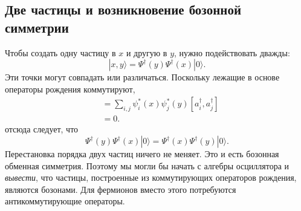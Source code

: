 \begin{classroomqa}
\end{classroomqa}

\subsection{Две частицы и возникновение бозонной симметрии}

Чтобы создать одну частицу в \(x\) и другую в \(y\), нужно подействовать дважды:
\begin{equation}
|x,y\rangle
=\Psi^\dagger(y)\Psi^\dagger(x)|0\rangle.
\label{eq:l06-two-particle-state}
\end{equation}
Эти точки могут совпадать или различаться. Поскольку лежащие в основе операторы рождения коммутируют,
\begin{align}
[\Psi^\dagger(x),\Psi^\dagger(y)]
&=\sum_{i,j}\psi_i^*(x)\psi_j^*(y)
[a_i^\dagger,a_j^\dagger] \\
&=0.
\end{align}
отсюда следует, что
\begin{equation}
\Psi^\dagger(y)\Psi^\dagger(x)|0\rangle
=\Psi^\dagger(x)\Psi^\dagger(y)|0\rangle.
\label{eq:l06-boson-exchange}
\end{equation}
Перестановка порядка двух частиц ничего не меняет. Это и есть бозонная обменная симметрия. Поэтому мы могли бы начать с алгебры осциллятора и \emph{вывести}, что частицы, построенные из коммутирующих операторов рождения, являются бозонами. Для фермионов вместо этого потребуются антикоммутирующие операторы.

\begin{classroomqa}
\end{classroomqa}


